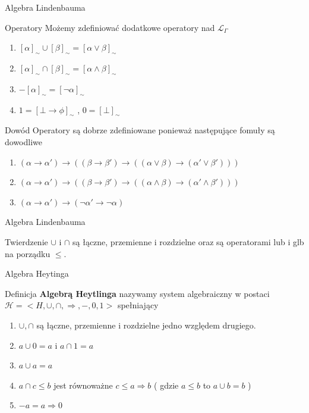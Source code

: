 \documentclass{beamer}
\begin{document}
\begin{frame}{Algebra Lindenbauma }
 \begin{block}{Operatory}
 Możemy zdefiniować dodatkowe operatory nad \( \mathcal{L}_{\Gamma} \)
 \begin{enumerate}
 \item \([\alpha]_{\sim} \cup [\beta]_{\sim} = [ \alpha \vee \beta ]_{\sim}\)
 \item \([\alpha]_{\sim} \cap [\beta]_{\sim} = [ \alpha \wedge \beta ]_{\sim}\)
  \item \(-[\alpha]_{\sim} = [\neg \alpha ]_{\sim}\)
  \item \( 1 = [\bot \rightarrow \phi ]_{\sim} \) , \( 0 = [\bot]_{\sim} \)
 \end{enumerate}
 \end{block}
 
  \begin{block}{Dowód}
 Operatory są dobrze zdefiniowane ponieważ następujące fomuły są dowodliwe
 \begin{enumerate}
 \item \((\alpha \rightarrow \alpha') \rightarrow 
 (
 	(\beta \rightarrow \beta') \rightarrow
 	(( \alpha \vee \beta) \rightarrow (\alpha' \vee \beta')))\)
  \item \((\alpha \rightarrow \alpha') \rightarrow 
 (
 	(\beta \rightarrow \beta') \rightarrow
 	(( \alpha \wedge \beta) \rightarrow (\alpha' \wedge \beta')))\)
  \item \((\alpha \rightarrow \alpha') \rightarrow 
(\neg \alpha' \rightarrow \neg \alpha)\)
 \end{enumerate}
 \end{block}
 
\end{frame}

\begin{frame}{Algebra Lindenbauma }
 \begin{block}{Twierdzenie}
 \( \cup \) i \(\cap \) są łączne, przemienne i rozdzielne oraz są operatorami lub i glb na porządku \( \leq \).
 \end{block}
 
\end{frame}

\begin{frame}{Algebra Heytinga}
 \begin{block}{Definicja}
\textbf{Algebrą Heytlinga} nazywamy system algebraiczny w postaci \( \mathcal{H} = < H, \cup, \cap, \Rightarrow, - , 0 ,1 > \) spełniający 
\begin{enumerate}
	\item \(\cup, \cap\) są łączne, przemienne i rozdzielne jedno względem drugiego.
 \item \( a \cup 0 = a \) i \( a \cap 1 = a \) 
 \item \( a \cup a  = a \) 
 \item \( a \cap c \leq b \) jest równoważne \( c \leq a \Rightarrow b \) ( gdzie \( a \leq b \) to \( a \cup b  = b\) )
 \item \( -a  = a \Rightarrow 0 \)
\end{enumerate}
 \end{block}
\end{frame}
 
\end{document}
